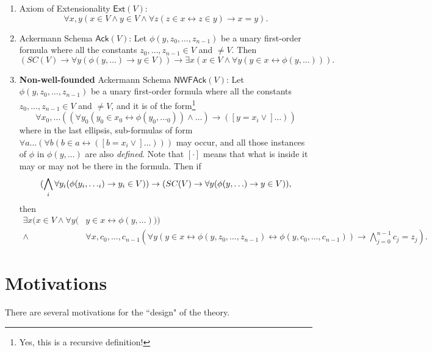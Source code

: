 \documentclass{article}
\begin{document}
\begin{enumerate}
	\item Axiom of Extensionality $\textsf{Ext}(V)$: $$\forall x, y (x \in V \wedge y \in V \wedge \forall z(z\in x \leftrightarrow z \in y) \rightarrow x = y).$$
	\item Ackermann Schema $\textsf{Ack}(V)$: Let $\phi(y, z_0, \ldots, z_{n-1})$ be a unary first-order formula where all the constants $z_0, \ldots, z_{n-1} \in V$ and $\ne V$. Then $$(SC(V) \rightarrow \forall y(\phi(y, \ldots) \rightarrow y \in V)) \rightarrow \exists x(x \in V \wedge \forall y(y \in x \leftrightarrow \phi(y, \ldots))).$$
    \item \textbf{Non-well-founded} Ackermann Schema $\textsf{NWFAck}(V)$: Let $\phi(y, z_0, \ldots, z_{n-1})$ be a unary first-order formula where all the constants $z_0, \ldots, z_{n-1} \in V$ and $\ne V$, and it is of the form\footnote{Yes, this is a recursive definition!}
$$\forall x_0, \ldots ((\forall y_0(y_0 \in x_0 \leftrightarrow \phi(y_0, \ldots_0)) \wedge \ldots) \rightarrow ([y = x_i \vee] \ldots))$$
where in the last ellipsis, sub-formulas of form $\forall a \ldots (\forall b (b \in a \leftrightarrow ([b = x_i \vee] \ldots)))$ may occur, and all those instances of $\phi$ in $\phi(y, \ldots)$ are also \textit{defined}. Note that $[\cdot]$ means that what is inside it may or may not be there in the formula. Then if 
$$(\bigwedge_i \forall y_i( \phi(y_i, \ldots_i) \rightarrow y_i \in V)) \rightarrow \\ (SC(V) \rightarrow \forall y(\phi(y, \ldots) \rightarrow y \in V)),$$
then
\begin{align*}
\exists x(x \in V \wedge \forall y(&y \in x \leftrightarrow \phi(y, \ldots))) \\ \wedge\ &\forall x, c_0, \ldots, c_{n-1} (\forall y (y \in x \leftrightarrow \phi(y, z_0, \ldots, z_{n-1}) \leftrightarrow \phi(y, c_0, \ldots, c_{n-1})) \rightarrow \bigwedge_{j=0}^{n-1} {c_j = z_j}).
\end{align*}
\end{enumerate}

\section{Motivations}
There are several motivations for the ``design" of the theory.\\
\end{document}

